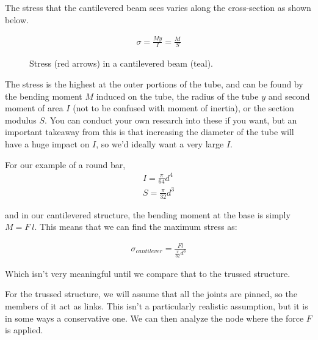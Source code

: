 The stress that the cantilevered beam sees varies along the cross-section as shown below.

\begin{figure}[H]
\begin{subfigure}[b]{.4\linewidth}
\end{subfigure}\begin{subfigure}[b]{.5\linewidth}
\large
\begin{align}
	\sigma = \frac{M y}{I} = \frac{M}{S}
\end{align}
\end{subfigure}
\caption{Stress (red arrows) in a cantilevered beam (teal).}
\end{figure}

The stress is the highest at the outer portions of the tube, and can be found by the bending moment $M$ induced on the tube, the radius of the tube $y$ and second moment of area $I$ (not to be confused with moment of inertia), or the section modulus $S$. You can conduct your own research into these if you want, but an important takeaway from this is that increasing the diameter of the tube will have a huge impact on $I$, so we'd ideally want a very large $I$.

For our example of a round bar,
\begin{align}
	I = \frac{\pi}{64}d^4 \\
	S = \frac{\pi}{32}d^3
\end{align}

and in our cantilevered structure, the bending moment at the base is simply $M = F \ l$. This means that we can find the maximum stress as:

\begin{align}
	\sigma_{cantilever} = \frac{F l}{\frac{\pi}{32}d^3}
\end{align}

Which isn't very meaningful until we compare that to the trussed structure.

For the trussed structure, we will assume that all the joints are pinned, so the members of it act as links. This isn't a particularly realistic assumption, but it is in some ways a conservative one. We can then analyze the node where the force $F$ is applied.

